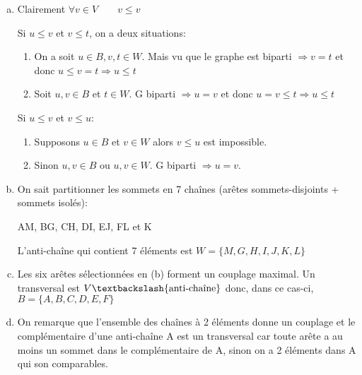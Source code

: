 \begin{enumerate}[(a)]
\item Clairement $\forall v \in V \qquad v \leq v$

Si $u \leq v$ et $v \leq t$, on a deux situations:
	\begin{enumerate}[-]
		\item On a soit $u \in B, v, t \in W$. Mais vu que le graphe est biparti $\Rightarrow v=t$ et donc $u \leq v=t \Rightarrow u \leq t$
		\item Soit $u,v \in B$ et $t\in W$. G biparti $\Rightarrow u=v$ et donc $u=v \leq t \Rightarrow u \leq t$
	\end{enumerate}

Si $u\leq v$ et $v \leq u$:
	\begin{enumerate}[-]
		\item Supposons $u \in B$ et $v \in W$ alors $v \leq u$ est impossible.
		\item Sinon $u,v \in B$ ou $u,v \in W$. G biparti $\Rightarrow u=v$.
	\end{enumerate}


\item On sait partitionner les sommets en 7 chaînes (arêtes sommets-disjoints + sommets isolés):

AM, BG, CH, DI, EJ, FL et K

L'anti-chaîne qui contient 7 éléments est $W = \{ M, G, H, I, J, K, L \}$

\item Les six arêtes sélectionnées en (b) forment un couplage maximal. Un transversal est $V \textbackslash \{\text{anti-chaîne}\}$ donc, dans ce cas-ci, $B=\{ A, B, C, D, E, F \}$

\item On remarque que l'ensemble des chaînes à 2 éléments donne un couplage et le complémentaire d'une anti-chaîne A est un transversal car toute arête a au moins un sommet dans le complémentaire de A, sinon on a 2 éléments dans A qui son comparables.
\end{enumerate}

